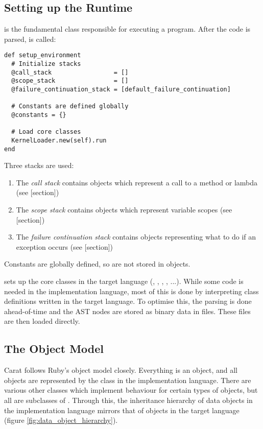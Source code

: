 \subsection{Setting up the Runtime}

 is the fundamental class responsible for executing a program. After the code is parsed,  is called:

\begin{lstlisting}
def setup_environment
  # Initialize stacks
  @call_stack                 = []
  @scope_stack                = []
  @failure_continuation_stack = [default_failure_continuation]
  
  # Constants are defined globally
  @constants = {}
  
  # Load core classes
  KernelLoader.new(self).run
end
\end{lstlisting}

Three stacks are used:

\begin{enumerate}
  \item The \textit{call stack} contains  objects which represent a call to a method or lambda (see [section])
  \item The \textit{scope stack} contains  objects which represent variable scopes (see [section])
  \item The \textit{failure continuation stack} contains objects representing what to do if an exception occurs (see [section])
\end{enumerate}

Constants are globally defined, so are not stored in  objects.

 sets up the core classes in the target language (, , , , ...). While some code is needed in the implementation language, most of this is done by interpreting class definitions written in the target language. To optimise this, the parsing is done ahead-of-time and the AST nodes are stored as binary data in files. These files are then loaded directly.

\subsection{The Object Model}
\label{sec:object_model}

Carat follows Ruby's object model closely. Everything is an object, and all objects are represented by the class  in the implementation language. There are various other classes which implement behaviour for certain types of objects, but all are subclasses of . Through this, the inheritance hierarchy of data objects in the implementation language mirrors that of objects in the target language (figure \ref{fig:data_object_hierarchy}).

